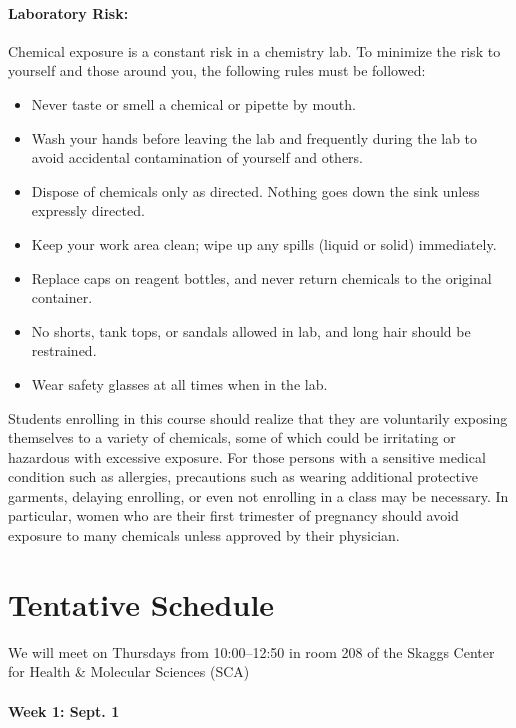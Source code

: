 \documentclass[12pt, letterpaper]{article}
\begin{document}
\paragraph{Laboratory Risk:}
Chemical exposure is a constant risk in a chemistry lab. To minimize the risk to yourself and those around you, the following rules must be followed:
\begin{itemize}
	\item Never taste or smell a chemical or pipette by mouth.
	\item Wash your hands before leaving the lab and frequently during the lab to avoid accidental contamination of yourself and others.
	\item Dispose of chemicals only as directed. Nothing goes down the sink unless expressly directed.
	\item Keep your work area clean; wipe up any spills (liquid or solid) immediately.
	\item Replace caps on reagent bottles, and never return chemicals to the original container.
	\item No shorts, tank tops, or sandals allowed in lab, and long hair should be restrained.
	\item Wear safety glasses at all times when in the lab.
\end{itemize}
Students enrolling in this course should realize that they are voluntarily exposing themselves to a variety of chemicals, some of which could be irritating or hazardous with excessive exposure.  For those persons with a sensitive medical condition such as allergies, precautions such as wearing additional protective garments, delaying enrolling, or even not enrolling in a class may be necessary.  In particular, women who are their first trimester of pregnancy should avoid exposure to many chemicals unless approved by their physician.

\section*{Tentative Schedule}
\begin{description}
	\item We will meet on Thursdays from 10:00--12:50 in room 208 of the Skaggs Center for Health \& Molecular Sciences (SCA)
\end{description}

\paragraph*{Week 1: Sept. 1}~
\end{document}
